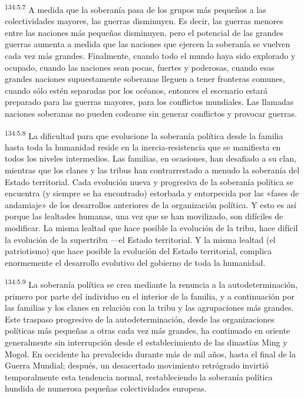 \par 
\textsuperscript{134:5.7} A medida que la soberanía pasa de los grupos más pequeños a las colectividades mayores, las guerras disminuyen. Es decir, las guerras menores entre las naciones más pequeñas disminuyen, pero el potencial de las grandes guerras aumenta a medida que las naciones que ejercen la soberanía se vuelven cada vez más grandes. Finalmente, cuando todo el mundo haya sido explorado y ocupado, cuando las naciones sean pocas, fuertes y poderosas, cuando esas grandes naciones supuestamente soberanas lleguen a tener fronteras comunes, cuando sólo estén separadas por los océanos, entonces el escenario estará preparado para las guerras mayores, para los conflictos mundiales. Las llamadas naciones soberanas no pueden codearse sin generar conflictos y provocar guerras.

\par 
\textsuperscript{134:5.8} La dificultad para que evolucione la soberanía política desde la familia hasta toda la humanidad reside en la inercia-resistencia que se manifiesta en todos los niveles intermedios. Las familias, en ocasiones, han desafiado a su clan, mientras que los clanes y las tribus han contrarrestado a menudo la soberanía del Estado territorial. Cada evolución nueva y progresiva de la soberanía política se encuentra (y siempre se ha encontrado) estorbada y entorpecida por las «fases de andamiaje» de los desarrollos anteriores de la organización política. Y esto es así porque las lealtades humanas, una vez que se han movilizado, son difíciles de modificar. La misma lealtad que hace posible la evolución de la tribu, hace difícil la evolución de la supertribu ---el Estado territorial. Y la misma lealtad (el patriotismo) que hace posible la evolución del Estado territorial, complica enormemente el desarrollo evolutivo del gobierno de toda la humanidad.

\par 
\textsuperscript{134:5.9} La soberanía política se crea mediante la renuncia a la autodeterminación, primero por parte del individuo en el interior de la familia, y a continuación por las familias y los clanes en relación con la tribu y las agrupaciones más grandes. Este traspaso progresivo de la autodeterminación, desde las organizaciones políticas más pequeñas a otras cada vez más grandes, ha continuado en oriente generalmente sin interrupción desde el establecimiento de las dinastías Ming y Mogol. En occidente ha prevalecido durante más de mil años, hasta el final de la Guerra Mundial; después, un desacertado movimiento retrógrado invirtió temporalmente esta tendencia normal, restableciendo la soberanía política hundida de numerosa pequeñas colectividades europeas.

